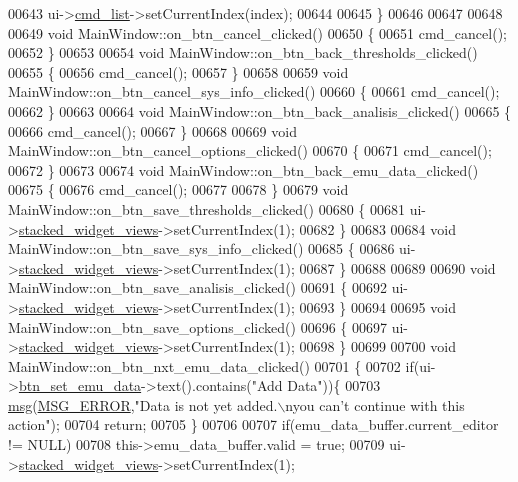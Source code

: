 \begin{DoxyCode}
00643     ui->\hyperlink{a00027_aa66ece71395b435e915d384fb63bac1d}{cmd\_list}->setCurrentIndex(index);
00644 
00645 \}
00646 
00647 
00648 
00649 \textcolor{keywordtype}{void} MainWindow::on\_btn\_cancel\_clicked()
00650 \{
00651     cmd\_cancel();
00652 \}
00653 
00654 \textcolor{keywordtype}{void} MainWindow::on\_btn\_back\_thresholds\_clicked()
00655 \{
00656     cmd\_cancel();
00657 \}
00658 
00659 \textcolor{keywordtype}{void} MainWindow::on\_btn\_cancel\_sys\_info\_clicked()
00660 \{
00661     cmd\_cancel();
00662 \}
00663 
00664 \textcolor{keywordtype}{void} MainWindow::on\_btn\_back\_analisis\_clicked()
00665 \{
00666     cmd\_cancel();
00667 \}
00668 
00669 \textcolor{keywordtype}{void} MainWindow::on\_btn\_cancel\_options\_clicked()
00670 \{
00671     cmd\_cancel();
00672 \}
00673 
00674 \textcolor{keywordtype}{void} MainWindow::on\_btn\_back\_emu\_data\_clicked()
00675 \{
00676     cmd\_cancel();
00677 
00678 \}
00679 \textcolor{keywordtype}{void} MainWindow::on\_btn\_save\_thresholds\_clicked()
00680 \{
00681      ui->\hyperlink{a00027_a59e39bd3d716004e840a5be5dda18b96}{stacked\_widget\_views}->setCurrentIndex(1);
00682 \}
00683 
00684 \textcolor{keywordtype}{void} MainWindow::on\_btn\_save\_sys\_info\_clicked()
00685 \{
00686     ui->\hyperlink{a00027_a59e39bd3d716004e840a5be5dda18b96}{stacked\_widget\_views}->setCurrentIndex(1);
00687 \}
00688 
00689 
00690 \textcolor{keywordtype}{void} MainWindow::on\_btn\_save\_analisis\_clicked()
00691 \{
00692     ui->\hyperlink{a00027_a59e39bd3d716004e840a5be5dda18b96}{stacked\_widget\_views}->setCurrentIndex(1);
00693 \}
00694 
00695 \textcolor{keywordtype}{void} MainWindow::on\_btn\_save\_options\_clicked()
00696 \{
00697     ui->\hyperlink{a00027_a59e39bd3d716004e840a5be5dda18b96}{stacked\_widget\_views}->setCurrentIndex(1);
00698 \}
00699 
00700 \textcolor{keywordtype}{void} MainWindow::on\_btn\_nxt\_emu\_data\_clicked()
00701 \{
00702     \textcolor{keywordflow}{if}(ui->\hyperlink{a00027_ad05944ce9c8afb0ab60549a326b8e0af}{btn\_set\_emu\_data}->text().contains(\textcolor{stringliteral}{"Add Data"}))\{
00703         \hyperlink{a00006_a6134b74dbfffbaf333e169bd09597b53}{msg}(\hyperlink{a00034_aa8a990825a5a62c89d2fb8b08d8a1070}{MSG\_ERROR},\textcolor{stringliteral}{"Data is not yet added.\(\backslash\)nyou can’t continue with this action"});
00704         \textcolor{keywordflow}{return};
00705     \}
00706 
00707     \textcolor{keywordflow}{if}(emu\_data\_buffer.current\_editor != NULL)
00708         this->emu\_data\_buffer.valid = \textcolor{keyword}{true};
00709      ui->\hyperlink{a00027_a59e39bd3d716004e840a5be5dda18b96}{stacked\_widget\_views}->setCurrentIndex(1);

\end{DoxyCode}
